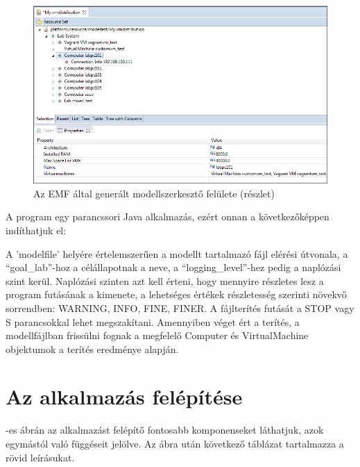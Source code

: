 \begin{figure}[ht]
\centering
\includegraphics[width=150mm, keepaspectratio]{figures/emfeditor.png}
\caption{Az EMF által generált modellszerkesztő felülete (részlet)}
\label{fig:emfeditor}
\end{figure}


A program egy parancssori Java alkalmazás, ezért onnan a következőképpen indíthatjuk el:


A 'modelfile' helyére értelemszerűen a modellt tartalmazó fájl elérési útvonala, a ``goal\_lab''-hoz a célállapotnak a neve, a ``logging\_level''-hez pedig a naplózási szint kerül. Naplózási szinten azt kell érteni, hogy mennyire részletes lesz a program futásának a kimenete, a lehetséges értékek részletesség szerinti növekvő sorrendben: WARNING, INFO, FINE, FINER.
A fájlterítés futását a STOP vagy S parancsokkal lehet megszakítani. Amennyiben véget ért a terítés, a modellfájlban frissülni fognak a megfelelő Computer és VirtualMachine objektumok a terítés eredménye alapján.

\section{Az alkalmazás felépítése}
\label{impl_app}

-es ábrán az alkalmazást felépítő fontosabb komponenseket láthatjuk, azok egymástól való függéseit jelölve. Az ábra után következő táblázat tartalmazza a rövid leírásukat.

